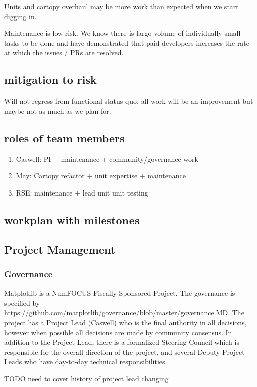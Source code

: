 \documentclass[12pt]{article}
\numberwithin{page}{section}
\begin{document}
Units and cartopy overhaul may be more work than expected when we
start digging in.

Maintenance is low risk.  We know there is largo volume of
individually small tasks to be done and have demonstrated that paid
developers increases the rate at which the issues / PRs are resolved.

\subsection{mitigation to risk}

Will not regress from functional status quo, all work will be an
improvement but maybe not as much as we plan for.

\subsection{roles of team members}
\begin{enumerate}
\item Caswell: PI + maintenance + community/governance work
\item May: Cartopy refactor + unit expertise + maintenance
\item RSE: maintenance + lead unit unit testing
\end{enumerate}

\subsection{workplan with milestones}

\subsection{Project Management}
\subsubsection{Governance}
Matplotlib is a NumFOCUS Fiscally Sponsored Project.  The governance
is specified by
\url{https://github.com/matplotlib/governance/blob/master/governance.MD}.
The project has a Project Lead (Caswell) who is the final authority in
all decisions, however when possible all decisions are made by
community consensus.  In addition to the Project Lead, there is a
formalized Steering Council which is responsible for the overall
direction of the project, and several Deputy Project Leads who have
day-to-day technical responsibilities.

TODO need to cover history of project lead changing
\end{document}
